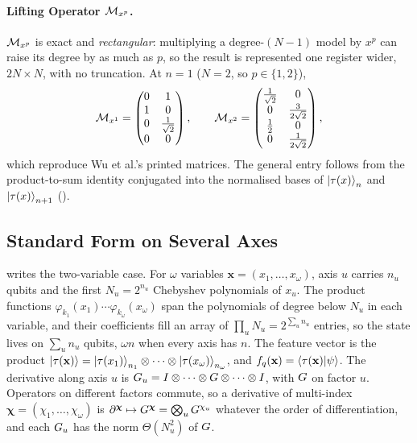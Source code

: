 \paragraph{Lifting Operator $\mathcal{M}_{x^p}$.} $\mathcal{M}_{x^p}$ is exact and
\emph{rectangular}: multiplying a degree-$(N{-}1)$ model by $x^p$ can raise its
degree by as much as $p$, so the result is represented one register wider,
$2N \times N$, with no truncation. At $n=1$ ($N=2$, so $p \in \{1,2\}$),
\begin{equation}
    \mathcal{M}_{x^1} =
    \begin{pmatrix}
        0 & 1 \\
        1 & 0 \\
        0 & \tfrac{1}{\sqrt2} \\
        0 & 0
    \end{pmatrix},
    \qquad
    \mathcal{M}_{x^2} =
    \begin{pmatrix}
        \tfrac{1}{\sqrt2} & 0 \\
        0 & \tfrac{3}{2\sqrt2} \\
        \tfrac{1}{2} & 0 \\
        0 & \tfrac{1}{2\sqrt2}
    \end{pmatrix},
    \label{eq:app-Mxp-example}
\end{equation}
which reproduce Wu et al.'s printed matrices. The general entry follows from the product-to-sum identity conjugated into the normalised bases of $\ket{\tau(x)}_n$ and $\ket{\tau(x)}_{n+1}$ ().
\subsection{Standard Form on Several Axes}
\label{app:pihm-multi-axis}
 writes the two-variable case. For $\omega$ variables $\mathbf x=(x_1,\dots,x_\omega)$, axis $u$ carries $n_u$ qubits and the first $N_u=2^{n_u}$ Chebyshev polynomials of $x_u$. The product functions $\varphi_{k_1}(x_1)\cdots\varphi_{k_\omega}(x_\omega)$ span the polynomials of degree below $N_u$ in each variable, and their coefficients fill an array of $\prod_uN_u=2^{\sum_un_u}$ entries, so the state lives on $\sum_un_u$ qubits, $\omega n$ when every axis has $n$. The feature vector is the product $\ket{\tau(\mathbf x)}=\ket{\tau(x_1)}_{n_1}\otimes\dots\otimes\ket{\tau(x_\omega)}_{n_\omega}$, and $f_q(\mathbf x)=\braket{\tau(\mathbf x)|\psi}$. The derivative along axis $u$ is $G_u=I\otimes\dots\otimes G\otimes\dots\otimes I$, with $G$ on factor $u$. Operators on different factors commute, so a derivative of multi-index $\boldsymbol\chi=(\chi_1,\dots,\chi_\omega)$ is $\partial^{\boldsymbol\chi}\mapsto G^{\boldsymbol\chi}=\bigotimes_uG^{\chi_u}$ whatever the order of differentiation, and each $G_u$ has the norm $\Theta(N_u^2)$ of $G$.

